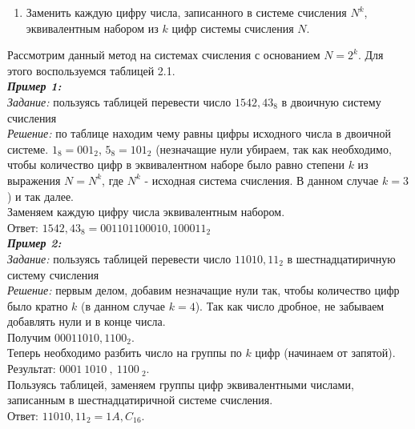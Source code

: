 \begin{enumerate}
\item Заменить каждую цифру числа, записанного в системе счисления $N^{k}$, эквивалентным набором из $k$ цифр системы счисления $N$.
\end{enumerate}

Рассмотрим данный метод на системах счисления с основанием $N = 2^{k}$. Для этого воспользуемся таблицей 2.1.\\


\emph{\textbf{Пример 1:}}
\\\emph{Задание:} пользуясь таблицей перевести число $1542,43_{8}$ в двоичную систему счисления
\\\emph{Решение:} по таблице находим чему равны цифры исходного числа в двоичной системе. $1_{8} = 001_{2}$, $5_{8} = 101_{2}$ (незначащие нули убираем, так как необходимо, чтобы количество цифр в эквивалентном наборе было равно степени $k$ из выражения $N = N^{k}$, где $N^{k}$ - исходная система счисления. В данном случае $k = 3$) и так далее.
\\Заменяем каждую цифру числа эквивалентным набором.
\\Ответ: $1542,43_{8} = 001101100010,100011_{2}$
\\

\emph{\textbf{Пример 2:}}
\\\emph{Задание:} пользуясь таблицей перевести число $11010,11_{2}$ в шестнадцатиричную систему счисления
\\\emph{Решение:} первым делом, добавим незначащие нули так, чтобы количество цифр было кратно $k$ (в данном случае $k = 4$). Так как число дробное, не забываем добавлять нули и в конце числа. \\Получим $00011010,1100_{2}$.
\\Теперь необходимо разбить число на группы по $k$ цифр (начинаем от запятой). Результат: $0001\ 1010\ ,\ 1100\ _{2}$.
\\Пользуясь таблицей, заменяем группы цифр эквивалентными числами, записанным в шестнадцатиричной системе счисления.
\\Ответ: $11010,11_{2} = 1A,C_{16}$.


